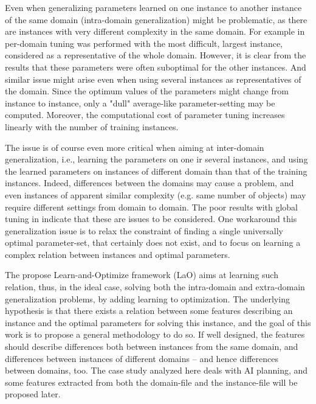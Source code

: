 \documentclass{MYsig-alternate}
\begin{document}
Even when generalizing parameters learned on one instance to another instance of the same domain (intra-domain generalization) might be problematic, as there are instances with very different complexity in the same domain. For example in \cite{BibGECCO:2010} per-domain tuning was performed with the most difficult, largest instance, considered as a representative of the whole domain. However, it is clear from the results that these parameters were often suboptimal for the other instances. And similar issue might arise even when using several instances as representatives of the domain. Since the optimum values of the parameters might change from instance to instance, only a "dull" average-like parameter-setting may be computed. Moreover, the computational cost of parameter tuning increases linearly with the number of training instances. 

The issue is of course even more critical when aiming at inter-domain generalization, i.e., learning the parameters on one ir several instances, and using the learned parameters on instances of different domain than that of the training instances. Indeed, differences between the domains may cause a problem, and even instances of apparent similar complexity (e.g. same number of objects) may require different settings from domain to domain. The poor results with global tuning in \cite{BibGECCO:2010} indicate that these are issues to be considered.
One workaround this generalization issue is to relax the constraint of finding a single universally optimal parameter-set, that certainly does not exist, and to focus on learning a complex relation between instances and optimal parameters. 

The propose Learn-and-Optimize framework (LaO) aims at learning such relation, thus, in the ideal case, solving both the intra-domain and extra-domain generalization problems, by adding learning to optimization. The underlying hypothesis is that there exists a relation between some features describing an instance and the optimal parameters for solving this instance, and the goal of this work is to propose a general methodology to do so. If well designed, the features should describe differences both between instances from the same domain, and differences between instances of different domains -- and hence differences between domains, too. 
The case study analyzed here deals with AI planning, and some features extracted from both the domain-file and the instance-file will be proposed later.
\end{document}
